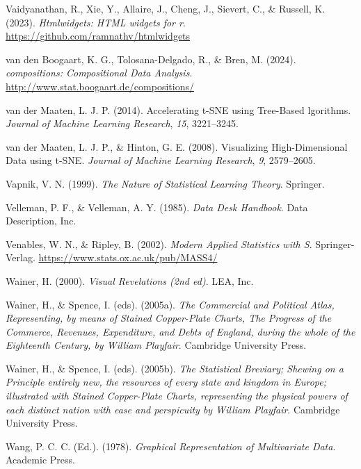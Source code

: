 \documentclass[
  letterpaper,
]{krantz}
\newlength{\cslhangindent}
\newenvironment{CSLReferences}[2] %
 {\begin{list}{}{%
  \setlength{\itemindent}{0pt}
  \setlength{\leftmargin}{0pt}
  \setlength{\parsep}{0pt}
  \ifodd #1
   \setlength{\leftmargin}{\cslhangindent}
   \setlength{\itemindent}{-1\cslhangindent}
  \fi
  \setlength{\itemsep}{#2\baselineskip}}}
 {\end{list}}
\begin{document}
\begin{CSLReferences}{1}{0}
Vaidyanathan, R., Xie, Y., Allaire, J., Cheng, J., Sievert, C., \&
Russell, K. (2023). \emph{Htmlwidgets: HTML widgets for r}.
\url{https://github.com/ramnathv/htmlwidgets}

{van den Boogaart, K. G., Tolosana-Delgado, R., \& Bren, M.} (2024).
\emph{{compositions}: {C}ompositional {D}ata {A}nalysis}.
\url{http://www.stat.boogaart.de/compositions/}

{van der Maaten, L. J. P.} (2014). Accelerating {t-SNE} using
{T}ree-{B}ased lgorithms. \emph{Journal of Machine Learning Research},
\emph{15}, 3221--3245.

{van der Maaten, L. J. P., \& Hinton, G. E.} (2008). Visualizing
{H}igh-{D}imensional {D}ata using {t-SNE}. \emph{Journal of Machine
Learning Research}, \emph{9}, 2579--2605.

Vapnik, V. N. (1999). \emph{The {N}ature of {S}tatistical {L}earning
{T}heory}. Springer.

Velleman, P. F., \& Velleman, A. Y. (1985). \emph{Data {D}esk
{H}andbook}. Data Description, Inc.

Venables, W. N., \& Ripley, B. (2002). \emph{Modern {A}pplied
{S}tatistics with {S}}. Springer-Verlag.
\url{https://www.stats.ox.ac.uk/pub/MASS4/}

Wainer, H. (2000). \emph{Visual {R}evelations (2nd ed)}. LEA, Inc.

Wainer, H., \& Spence, I. (eds). (2005a). \emph{The {C}ommercial and
{P}olitical {A}tlas, {R}epresenting, by means of {S}tained
{C}opper-{P}late {C}harts, {T}he {P}rogress of the {C}ommerce,
{R}evenues, {E}xpenditure, and {D}ebts of {E}ngland, during the whole of
the {E}ighteenth {C}entury, by {W}illiam {P}layfair}. Cambridge
University Press.

Wainer, H., \& Spence, I. (eds). (2005b). \emph{The {S}tatistical
{B}reviary; {S}hewing on a {P}rinciple entirely new, the resources of
every state and kingdom in {E}urope; illustrated with {S}tained
{C}opper-{P}late {C}harts, representing the physical powers of each
distinct nation with ease and perspicuity by {W}illiam {P}layfair}.
Cambridge University Press.

Wang, P. C. C. (Ed.). (1978). \emph{{G}raphical {R}epresentation of
{M}ultivariate {D}ata}. Academic Press.


\end{CSLReferences}
\end{document}
